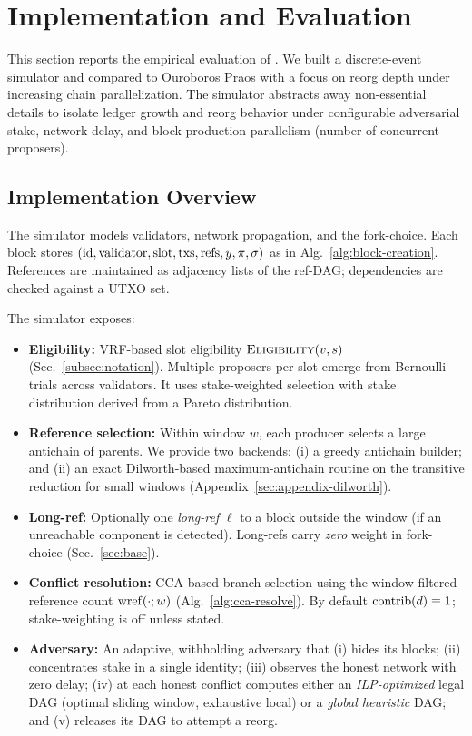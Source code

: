 
\section{Implementation and Evaluation}
\label{sec:impl-eval}
This section reports the empirical evaluation of \ProjBase. We built a discrete-event simulator and compared \ProjBase to Ouroboros Praos with a focus on reorg depth under increasing chain parallelization. The simulator abstracts away non-essential details to isolate ledger growth and reorg behavior under configurable adversarial stake, network delay, and block-production parallelism (number of concurrent proposers).

\subsection{Implementation Overview}
The simulator models validators, network propagation, and the \ProjBase{} fork-choice. Each block stores
$(\mathrm{id},\mathrm{validator},\mathrm{slot},\mathrm{txs},\mathrm{refs},y,\pi,\sigma)$ as in Alg.~\ref{alg:block-creation}. References are maintained as adjacency lists of the ref-DAG; dependencies are checked against a UTXO set.

The simulator exposes:
\begin{itemize}
\item \textbf{Eligibility:} VRF-based slot eligibility $\textsc{Eligibility}(v,s)$ (Sec.~\ref{subsec:notation}). Multiple proposers per slot emerge from Bernoulli trials across validators. It uses stake-weighted selection with stake distribution derived from a Pareto distribution.
\item \textbf{Reference selection:} Within window $w$, each producer selects a large antichain of parents. We provide two backends: (i) a greedy antichain builder; and (ii) an exact Dilworth-based maximum-antichain routine on the transitive reduction for small windows (Appendix~\ref{sec:appendix-dilworth}).
\item \textbf{Long-ref:} Optionally one \emph{long-ref} $\ell$ to a block outside the window (if an unreachable component is detected). Long-refs carry \emph{zero} weight in fork-choice (Sec.~\ref{sec:base}).
\item \textbf{Conflict resolution:} CCA-based branch selection using the window-filtered reference count $\mathrm{wref}(\cdot;w)$ (Alg.~\ref{alg:cca-resolve}). By default $\mathrm{contrib}(d)\equiv 1$; stake-weighting is off unless stated.
\item \textbf{Adversary:} An adaptive, withholding adversary that (i) hides its blocks; (ii) concentrates stake in a single identity; (iii) observes the honest network with zero delay; (iv) at each honest conflict computes either an \emph{ILP-optimized} legal DAG (optimal sliding window, exhaustive local) or a \emph{global heuristic} DAG; and (v) releases its DAG to attempt a reorg.
\end{itemize}

